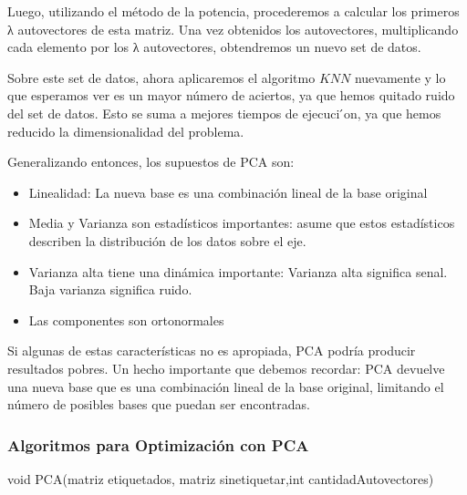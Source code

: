 Luego, utilizando el método de la potencia, procederemos a calcular los primeros λ autovectores de esta matriz. Una vez obtenidos los
autovectores, multiplicando cada elemento por los λ autovectores, obtendremos un nuevo set de datos.

Sobre este set de datos, ahora aplicaremos el algoritmo $KNN$ nuevamente y lo que esperamos ver es un mayor número de aciertos, ya que hemos quitado ruido del set de datos. Esto se suma a mejores tiempos de ejecuci ́on, ya que hemos reducido la dimensionalidad del problema.

Generalizando entonces, los supuestos de PCA son:

\begin{itemize}
\item Linealidad: La nueva base es una combinación lineal de la base original
\item Media y Varianza son estadísticos importantes: asume que estos estadísticos describen la distribución de los datos sobre el eje.
\item Varianza alta tiene una dinámica importante: Varianza alta significa senal. Baja varianza significa ruido.
\item Las componentes son ortonormales
\end{itemize}

Si algunas de estas características no es apropiada, PCA podría producir resultados pobres. Un hecho importante que debemos recordar: PCA devuelve una nueva base que es una combinación lineal de la base original, limitando el número de posibles bases que puedan ser encontradas.

\subsubsection {Algoritmos para Optimización con PCA}

\begin{algorithm}
    \begin{algorithmic}[1]\parskip=2mm
        \caption{void PCA(matriz etiquetados, matriz sinetiquetar,int cantidadAutovectores)}
        \\
        \\
        \\
        \\
        \\
        \\
        \\
        \\
        \\
    \end{algorithmic}
\end{algorithm}


